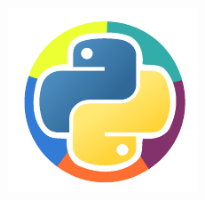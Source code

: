 \sommaire

\vfill
\begin{center}
 \includegraphics[width=5cm]{images/logo_afpy_v3.pdf}
\end{center}
\vfill



